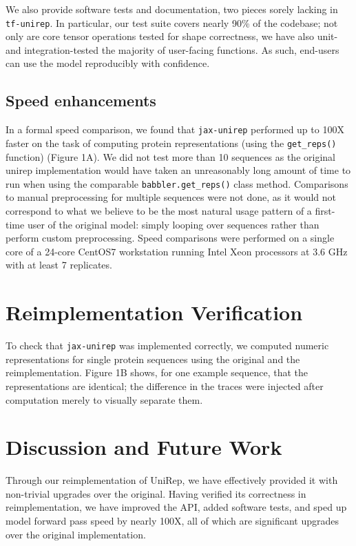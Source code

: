 \documentclass{bioinfo}
\begin{document}
We also provide software tests and documentation,
two pieces sorely lacking in \verb|tf-unirep|.
In particular, our test suite covers nearly 90\% of the codebase;
not only are core tensor operations tested for shape correctness,
we have also unit- and integration-tested
the majority of user-facing functions.
As such, end-users can use the model reproducibly with confidence.

\subsection{Speed enhancements}

In a formal speed comparison, we found that \verb|jax-unirep|
performed up to 100X faster on the task of computing protein representations
(using the \verb|get_reps()| function) (Figure 1A\vphantom{\ref{fig:01}}).
We did not test more than 10 sequences
as the original unirep implementation would have taken
an unreasonably long amount of time to run
when using the comparable \verb|babbler.get_reps()| class method.
Comparisons to manual preprocessing for multiple sequences were not done,
as it would not correspond to what we believe to be
the most natural usage pattern of a first-time user of the original model:
simply looping over sequences rather than perform custom preprocessing.
Speed comparisons were performed on a single core of a 24-core
CentOS7 workstation running Intel Xeon processors at 3.6 GHz
with at least 7 replicates.

\section{Reimplementation Verification}

To check that \verb|jax-unirep| was implemented correctly,
we computed numeric representations for single protein sequences
using the original and the reimplementation.
Figure 1B\vphantom{\ref{fig:01}} shows, for one example sequence,
that the representations are identical;
the difference in the traces were injected after computation
merely to visually separate them.

\section{Discussion and Future Work}

Through our reimplementation of UniRep,
we have effectively provided it with non-trivial upgrades over the original.
Having verified its correctness in reimplementation,
we have improved the API, added software tests,
and sped up model forward pass speed by nearly 100X,
all of which are significant upgrades over the original implementation.
\end{document}
